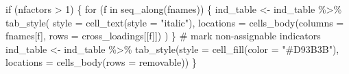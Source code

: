 \documentclass[
  12pt,
]{article}
\newenvironment{Shaded}{\begin{snugshade}}{\end{snugshade}}
\newcommand{\AttributeTok}[1]{\textcolor[rgb]{0.40,0.45,0.13}{#1}}
\newcommand{\CommentTok}[1]{\textcolor[rgb]{0.37,0.37,0.37}{#1}}
\newcommand{\ControlFlowTok}[1]{\textcolor[rgb]{0.00,0.23,0.31}{#1}}
\newcommand{\DecValTok}[1]{\textcolor[rgb]{0.68,0.00,0.00}{#1}}
\newcommand{\FunctionTok}[1]{\textcolor[rgb]{0.28,0.35,0.67}{#1}}
\newcommand{\NormalTok}[1]{\textcolor[rgb]{0.00,0.23,0.31}{#1}}
\newcommand{\OtherTok}[1]{\textcolor[rgb]{0.00,0.23,0.31}{#1}}
\newcommand{\SpecialCharTok}[1]{\textcolor[rgb]{0.37,0.37,0.37}{#1}}
\newcommand{\StringTok}[1]{\textcolor[rgb]{0.13,0.47,0.30}{#1}}
\begin{document}
\begin{Shaded}
\begin{Highlighting}[]
  \ControlFlowTok{if}\NormalTok{ (nfactors }\SpecialCharTok{\textgreater{}} \DecValTok{1}\NormalTok{) \{}
    \ControlFlowTok{for}\NormalTok{ (f }\ControlFlowTok{in} \FunctionTok{seq\_along}\NormalTok{(fnames)) \{}
\NormalTok{      ind\_table }\OtherTok{\textless{}{-}}
\NormalTok{        ind\_table }\SpecialCharTok{\%\textgreater{}\%}  \FunctionTok{tab\_style}\NormalTok{(}
          \AttributeTok{style =} \FunctionTok{cell\_text}\NormalTok{(}\AttributeTok{style =} \StringTok{"italic"}\NormalTok{),}
          \AttributeTok{locations =} \FunctionTok{cells\_body}\NormalTok{(}\AttributeTok{columns =}\NormalTok{ fnames[f], }\AttributeTok{rows =}\NormalTok{ cross\_loadings[[f]])}
\NormalTok{        )}
\NormalTok{    \}}
    \CommentTok{\# mark non{-}assignable indicators}
\NormalTok{    ind\_table }\OtherTok{\textless{}{-}}
\NormalTok{      ind\_table }\SpecialCharTok{\%\textgreater{}\%}  \FunctionTok{tab\_style}\NormalTok{(}\AttributeTok{style =} \FunctionTok{cell\_fill}\NormalTok{(}\AttributeTok{color =} \StringTok{"\#D93B3B"}\NormalTok{),}
                               \AttributeTok{locations =} \FunctionTok{cells\_body}\NormalTok{(}\AttributeTok{rows =}\NormalTok{ removable))}
\NormalTok{  \}}
  

\end{Highlighting}
\end{Shaded}
\end{document}

